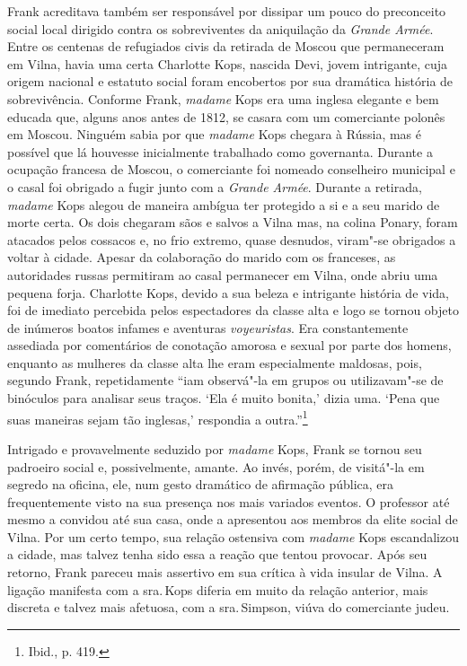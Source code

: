 Frank acreditava também ser responsável por dissipar um pouco do
preconceito social local dirigido contra os sobreviventes da aniquilação
da \textit{Grande Armée}. Entre os centenas de refugiados civis da
retirada de Moscou que permaneceram em Vilna, havia uma certa Charlotte
Kops, nascida Devi, jovem intrigante, cuja origem nacional e estatuto
social foram encobertos por sua dramática história de sobrevivência.
Conforme Frank, \textit{madame} Kops era uma inglesa elegante e bem educada que,
alguns anos antes de 1812, se casara com um comerciante polonês em
Moscou. Ninguém sabia por que \textit{madame} Kops chegara à Rússia, mas é
possível que lá houvesse inicialmente trabalhado como governanta.
Durante a ocupação francesa de Moscou, o comerciante foi nomeado
conselheiro municipal e o casal foi obrigado a fugir junto com a
\textit{Grande Armée}. Durante a retirada, \textit{madame} Kops alegou de maneira
ambígua ter protegido a si e a seu marido de morte certa. Os dois
chegaram sãos e salvos a Vilna mas, na colina Ponary, foram atacados
pelos cossacos e, no frio extremo, quase desnudos, viram"-se obrigados a
voltar à cidade. Apesar da colaboração do marido com os franceses, as
autoridades russas permitiram ao casal permanecer em Vilna, onde abriu
uma pequena forja. Charlotte Kops, devido a sua beleza e intrigante
história de vida, foi de imediato percebida pelos espectadores da classe
alta e logo se tornou objeto de inúmeros boatos infames e aventuras
\textit{voyeuristas}. Era constantemente assediada por comentários de conotação
amorosa e sexual por parte dos homens, enquanto as mulheres da classe
alta lhe eram especialmente maldosas, pois, segundo Frank, repetidamente
``iam observá"-la em grupos ou utilizavam"-se de binóculos para analisar
seus traços. `Ela é muito bonita,' dizia uma. `Pena que suas maneiras
sejam tão inglesas,' respondia a outra.''\footnote{Ibid., p. 419.}

Intrigado e provavelmente seduzido por \textit{madame} Kops, Frank se tornou seu
padroeiro social e, possivelmente, amante. Ao invés, porém, de visitá"-la
em segredo na oficina, ele, num gesto dramático de afirmação pública,
era frequentemente visto na sua presença nos mais variados eventos. O
professor até mesmo a convidou até sua casa, onde a apresentou aos
membros da elite social de Vilna. Por um certo tempo, sua relação
ostensiva com \textit{madame} Kops escandalizou a cidade, mas talvez tenha sido
essa a reação que tentou provocar. Após seu retorno, Frank pareceu mais
assertivo em sua crítica à vida insular de Vilna. A ligação manifesta
com a sra.\,Kops diferia em muito da relação anterior, mais discreta e
talvez mais afetuosa, com a sra.\,Simpson, viúva do comerciante judeu.


